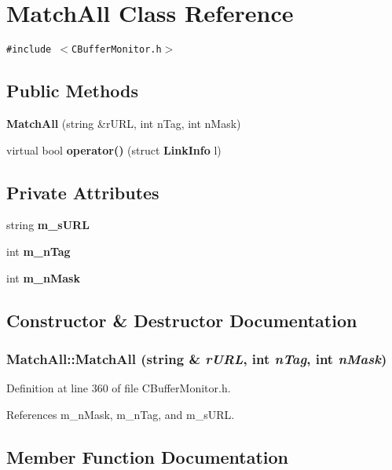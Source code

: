 \section{Match\-All  Class Reference}
\label{classMatchAll}
{\tt \#include $<$CBuffer\-Monitor.h$>$}

\subsection*{Public Methods}
\begin{CompactItemize}
\item 
{\bf Match\-All} (string \&r\-URL, int n\-Tag, int n\-Mask)
\item 
virtual bool {\bf operator()} (struct {\bf Link\-Info} l)
\end{CompactItemize}
\subsection*{Private Attributes}
\begin{CompactItemize}
\item 
string {\bf m\_\-s\-URL}
\item 
int {\bf m\_\-n\-Tag}
\item 
int {\bf m\_\-n\-Mask}
\end{CompactItemize}


\subsection{Constructor \& Destructor Documentation}
\subsubsection{\setlength{\rightskip}{0pt plus 5cm}Match\-All::Match\-All (string \& {\em r\-URL}, int {\em n\-Tag}, int {\em n\-Mask})\hspace{0.3cm}{\tt  [inline]}}\label{classMatchAll_a0}




Definition at line 360 of file CBuffer\-Monitor.h.

References m\_\-n\-Mask, m\_\-n\-Tag, and m\_\-s\-URL.

\subsection{Member Function Documentation}
